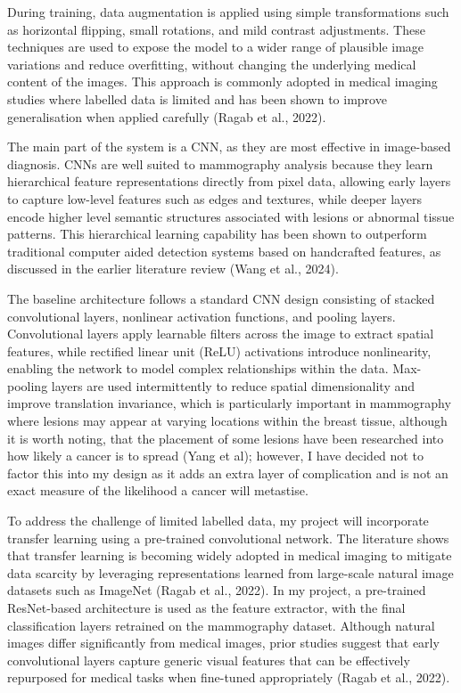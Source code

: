During training, data augmentation is applied using simple transformations such as horizontal flipping, small rotations, and mild contrast adjustments. These techniques are used to expose the model to a wider range of plausible image variations and reduce overfitting, without changing the underlying medical content of the images. This approach is commonly adopted in medical imaging studies where labelled data is limited and has been shown to improve generalisation when applied carefully (Ragab et al., 2022).

The main part of the system is a CNN, as they are most effective in image-based diagnosis. CNNs are well suited to mammography analysis because they learn hierarchical feature representations directly from pixel data, allowing early layers to capture low-level features such as edges and textures, while deeper layers encode higher level semantic structures associated with lesions or abnormal tissue patterns. This hierarchical learning capability has been shown to outperform traditional computer aided detection systems based on handcrafted features, as discussed in the earlier literature review (Wang et al., 2024).

The baseline architecture follows a standard CNN design consisting of stacked convolutional layers, nonlinear activation functions, and pooling layers. Convolutional layers apply learnable filters across the image to extract spatial features, while rectified linear unit (ReLU) activations introduce nonlinearity, enabling the network to model complex relationships within the data. Max-pooling layers are used intermittently to reduce spatial dimensionality and improve translation invariance, which is particularly important in mammography where lesions may appear at varying locations within the breast tissue, although it is worth noting, that the placement of some lesions have been researched into how likely a cancer is to spread (Yang et al); however, I have decided not to factor this into my design as it adds an extra layer of complication and is not an exact measure of the likelihood a cancer will metastise.

To address the challenge of limited labelled data, my project will incorporate transfer learning using a pre-trained convolutional network. The literature shows that transfer learning is becoming widely adopted in medical imaging to mitigate data scarcity by leveraging representations learned from large-scale natural image datasets such as ImageNet (Ragab et al., 2022). In my project, a pre-trained ResNet-based architecture is used as the feature extractor, with the final classification layers retrained on the mammography dataset. Although natural images differ significantly from medical images, prior studies suggest that early convolutional layers capture generic visual features that can be effectively repurposed for medical tasks when fine-tuned appropriately (Ragab et al., 2022).

